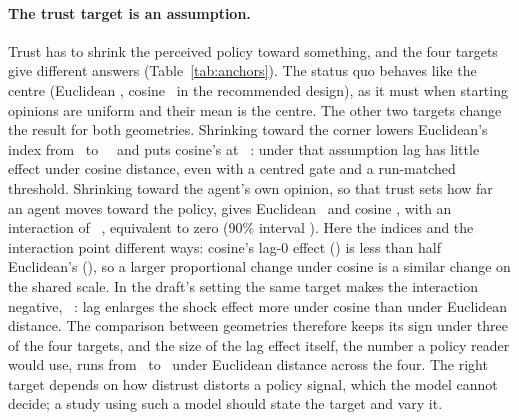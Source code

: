 \documentclass[11pt]{article}
\begin{document}
\paragraph{The trust target is an assumption.}
Trust has to shrink the perceived policy toward something, and the four targets give different answers (Table~\ref{tab:anchors}).
The status quo behaves like the centre (Euclidean \VTCentredRunStatusQuoEucIdx, cosine \VTCentredRunStatusQuoCosIdx\ in the recommended design), as it must when starting opinions are uniform and their mean is the centre.
The other two targets change the result for both geometries.
Shrinking toward the corner lowers Euclidean's index from \VTCentredRunCentreEucIdx\ to \VTCentredRunCornerEucIdx\ \VTCentredRunCornerEucIdxCI\ and puts cosine's at \VTCentredRunCornerCosIdx\ \VTCentredRunCornerCosIdxCI: under that assumption lag has little effect under cosine distance, even with a centred gate and a run-matched threshold.
Shrinking toward the agent's own opinion, so that trust sets how far an agent moves toward the policy, gives Euclidean \VTCentredRunOwnEucIdx\ and cosine \VTCentredRunOwnCosIdx, with an interaction of \VTCentredRunOwnInter\ \VTCentredRunOwnCI, equivalent to zero (90\% interval \VTCentredRunOwnCINinety).
Here the indices and the interaction point different ways: cosine's lag-0 effect (\VTCentredRunOwnCosZero) is less than half Euclidean's (\VTCentredRunOwnEucZero), so a larger proportional change under cosine is a similar change on the shared scale.
In the draft's setting the same target makes the interaction negative, \VTUnitRawOwnInter\ \VTUnitRawOwnCI: lag enlarges the shock effect more under cosine than under Euclidean distance.
The comparison between geometries therefore keeps its sign under three of the four targets, and the size of the lag effect itself, the number a policy reader would use, runs from \VTargetEucMin\ to \VTargetEucMax\ under Euclidean distance across the four.
The right target depends on how distrust distorts a policy signal, which the model cannot decide; a study using such a model should state the target and vary it.

\begin{table}[t]
\centering\small
\caption{Trust targets in the recommended design (centred gate, run-matched threshold recalibrated for each target, anchor pull): lag index per geometry (95\% CI), lag-0 relative shock effect (Euclidean / cosine) and the paired interaction; $^{=}$ marks equivalence to zero.}
\label{tab:anchors}

\end{table}
\end{document}
